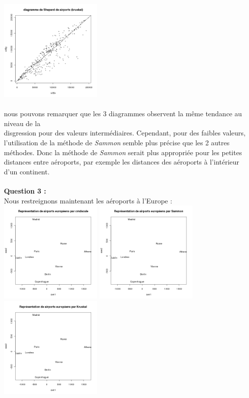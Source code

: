 \documentclass[a4paper, 10pt]{article}
\begin{document}
\includegraphics[height = 5cm, width = 5cm]{plots/plot_airports_shepard_kruskal.png}\\ \\
nous pouvons remarquer que les 3 diagrammes observent la même tendance au niveau de la\\disgression pour des valeurs intermédiaires.
Cependant, pour des faibles valeurs, l'utilisation de la méthode de \textit{Sammon} semble plus précise que les 2 autres méthodes.
Donc la méthode de \textit{Sammon} serait plus appropriée pour les petites distances entre aéroports, par exemple les distances
des aéroports à l'intérieur d'un continent.\\ \\
\textbf{Question 3 :}\\
Nous restreignons maintenant les aéroports à l'Europe :\\
\includegraphics[height = 5cm, width = 5cm]{plots/plot_euro_cmdscale.png}
\includegraphics[height = 5cm, width = 5cm]{plots/plot_euro_sammon.png}
\includegraphics[height = 5cm, width = 5cm]{plots/plot_euro_kruskal.png}\\ \\
\end{document}

